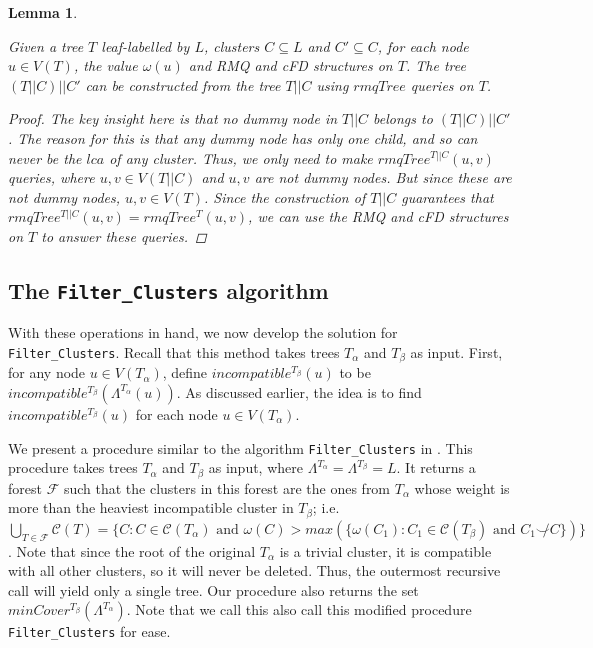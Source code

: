 \documentclass[12pt,a4paper]{article}
\newcommand{\compatible}{\smile}
\newcommand{\leafset}{\Lambda}
\newcommand{\weight}{\omega}
\newcommand{\TA}{T_\alpha}
\newcommand{\TB}{T_\beta}
\newtheorem{restrictedrmq}[incompatibility]{Lemma}
\begin{document}
    \begin{restrictedrmq}
        \label{lem:restrictedrmq}

        Given a tree $T$ leaf-labelled by $L$, clusters $C \subseteq L$ and $C' \subseteq C$, for each node $u \in V(T)$, the value $\weight(u)$ and RMQ and cFD structures on $T$. The tree $(T||C)||C'$ can be constructed from the tree $T||C$ using $rmqTree$ queries on $T$.

        \begin{proof}
            The key insight here is that no dummy node in $T||C$ belongs to $(T||C)||C'$. The reason for this is that any dummy node has only one child, and so can never be the $lca$ of any cluster. Thus, we only need to make $rmqTree^{T||C}(u, v)$ queries, where $u, v \in V(T||C)$ and $u, v$ are not dummy nodes. But since these are not dummy nodes, $u, v \in V(T)$. Since the construction of $T||C$ guarantees that $rmqTree^{T||C}(u, v) = rmqTree^{T}(u, v)$, we can use the RMQ and cFD structures on $T$ to answer these queries.
        \end{proof}
    \end{restrictedrmq}

    \subsection{The \texttt{Filter\_Clusters} algorithm}
    \label{subsec:filterclusters}

    With these operations in hand, we now develop the solution for \texttt{Filter\_Clusters}. Recall that this method takes trees $\TA$ and $\TB$ as input. First, for any node $u \in V(\TA)$, define $incompatible^{\TB}(u)$ to be $incompatible^{\TB}(\leafset^{\TA}(u))$. As discussed earlier, the idea is to find $incompatible^{\TB}(u)$ for each node $u \in V(\TA)$.

    We present a procedure similar to the algorithm \texttt{Filter\_Clusters} in \cite{jansson2018algorithms}. This procedure takes trees $\TA$ and $\TB$ as input, where $\leafset^{\TA} = \leafset^{\TB} = L$. It returns a forest $\mathcal{F}$ such that the clusters in this forest are the ones from $\TA$ whose weight is more than the heaviest incompatible cluster in $\TB$; i.e. $\bigcup_{T \in \mathcal{F}} \mathcal{C}(T) = \{C : C \in \mathcal{C}(\TA) \text{ and } \weight(C) > max(\{\weight(C_1) : C_1 \in \mathcal{C}(\TB) \text{ and } C_1 \not\compatible C\})\}$. Note that since the root of the original $\TA$ is a trivial cluster, it is compatible with all other clusters, so it will never be deleted. Thus, the outermost recursive call will yield only a single tree. Our procedure also returns the set $minCover^{\TB}(\leafset^{\TA})$. Note that we call this also call this modified procedure \texttt{Filter\_Clusters} for ease.
\end{document}
